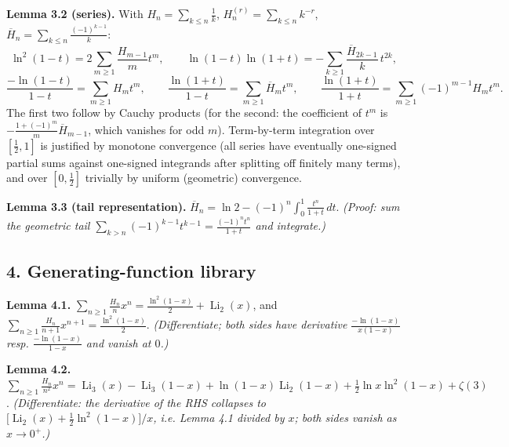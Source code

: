 \documentclass[11pt]{article}
\theoremstyle{remark}
\begin{document}
\textbf{Lemma 3.2 (series).} With $H_n=\sum_{k\le n}\tfrac1k$, $H_n^{(r)}=\sum_{k\le n}k^{-r}$, $\overline H_n=\sum_{k\le n}\tfrac{(-1)^{k-1}}{k}$:
\[
\ln^2(1-t)=2\sum_{m\ge1}\frac{H_{m-1}}{m}t^m,\qquad
\ln(1-t)\ln(1+t)=-\sum_{k\ge1}\frac{\overline H_{2k-1}}{k}\,t^{2k},
\]
\[
\frac{-\ln(1-t)}{1-t}=\sum_{m\ge1}H_mt^m,\qquad
\frac{\ln(1+t)}{1-t}=\sum_{m\ge1}\overline H_m t^m,\qquad
\frac{\ln(1+t)}{1+t}=\sum_{m\ge1}(-1)^{m-1}H_mt^m .
\]
The first two follow by Cauchy products (for the second: the coefficient of $t^m$ is $-\frac{1+(-1)^m}{m}\overline H_{m-1}$, which vanishes for odd $m$). Term-by-term integration over $[\tfrac12,1]$ is justified by monotone convergence (all series have eventually one-signed partial sums against one-signed integrands after splitting off finitely many terms), and over $[0,\tfrac12]$ trivially by uniform (geometric) convergence.

\textbf{Lemma 3.3 (tail representation).} $\displaystyle \overline H_n=\ln 2-(-1)^n\int_0^1\frac{t^n}{1+t}\,dt.$
\textit{(Proof: sum the geometric tail $\sum_{k>n}(-1)^{k-1}t^{k-1}=\frac{(-1)^nt^n}{1+t}$ and integrate.)}

\subsection*{4. Generating-function library}

\textbf{Lemma 4.1.} $\displaystyle\sum_{n\ge1}\frac{H_n}{n}x^n=\frac{\ln^2(1-x)}{2}+\operatorname{Li}_2(x)$, and $\displaystyle\sum_{n\ge1}\frac{H_n}{n+1}x^{n+1}=\frac{\ln^2(1-x)}{2}$.
\textit{(Differentiate; both sides have derivative $\frac{-\ln(1-x)}{x(1-x)}$ resp. $\frac{-\ln(1-x)}{1-x}$ and vanish at $0$.)}

\textbf{Lemma 4.2.} $\displaystyle\sum_{n\ge1}\frac{H_n}{n^2}x^n=\operatorname{Li}_3(x)-\operatorname{Li}_3(1-x)+\ln(1-x)\operatorname{Li}_2(1-x)+\frac12\ln x\ln^2(1-x)+\zeta(3)$.
\textit{(Differentiate: the derivative of the RHS collapses to $\bigl[\operatorname{Li}_2(x)+\tfrac12\ln^2(1-x)\bigr]/x$, i.e. Lemma 4.1 divided by $x$; both sides vanish as $x\to0^+$.)}
\end{document}
